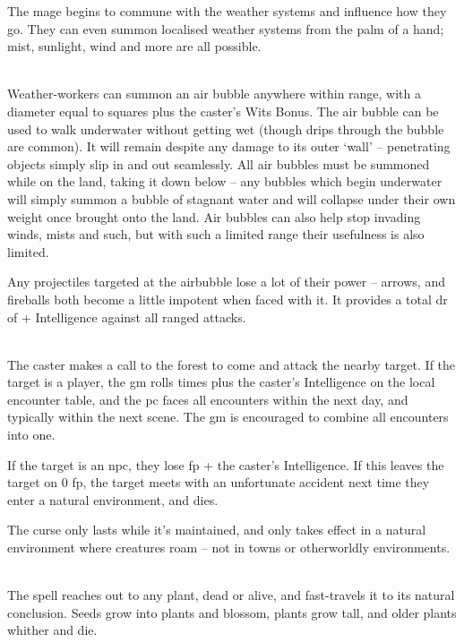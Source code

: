 \begin{multicols}{2}
\spelllevel

The mage begins to commune with the weather systems and influence how they go. They can even summon localised weather systems from the palm of a hand; mist, sunlight, wind and more are all possible.

\\
Weather-workers can summon an air bubble anywhere within range, with a diameter equal to  squares plus the caster's Wits Bonus. The air bubble can be used to walk underwater without getting wet (though drips through the bubble are common). It will remain despite any damage to its outer `wall' -- penetrating objects simply slip in and out seamlessly. All air bubbles must be summoned while on the land, taking it down below -- any bubbles which begin underwater will simply summon a bubble of stagnant water and will collapse under their own weight once brought onto the land. Air bubbles can also help stop invading winds, mists and such, but with such a limited range their usefulness is also limited.

Any projectiles targeted at the airbubble lose a lot of their power -- arrows, and fireballs both become a little impotent when faced with it.
It provides a total \gls{dr} of  + Intelligence against all ranged attacks.

\spelllevel

\\
The caster makes a call to the forest to come and attack the nearby target.  If the target is a player, the \gls{gm} rolls  times plus the caster's Intelligence on the local encounter table, and the \gls{pc} faces all encounters within the next day, and typically within the next scene.  The \gls{gm} is encouraged to combine all encounters into one.

If the target is an \gls{npc}, they lose  \gls{fp} + the caster's Intelligence.
If this leaves the target on 0 \gls{fp}, the target meets with an unfortunate accident next time they enter a natural environment, and dies.

The curse only lasts while it's maintained, and only takes effect in a natural environment where creatures roam -- not in towns or otherworldly environments.

\\
The spell reaches out to any plant, dead or alive, and fast-travels it to its natural conclusion.
Seeds grow into plants and blossom, plants grow tall, and older plants whither and die.


\end{multicols}
